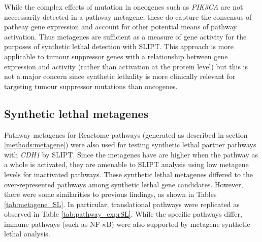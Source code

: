  While the complex effects of mutation in oncogenes such as \textit{PIK3CA} are not neccessarily detected in a pathway metagene, these do capture the consensus of patheay gene expression and account for other potential means of pathway activation. Thus metagenes are sufficient as a measure of gene activity for the purposes of synthetic lethal detection with SLIPT. This approach is more applicable to tumour suppressor genes with a relationship between gene expression and activity (rather than activation at the protein level) but this is not a major concern since synthetic lethality is more clinically relevant for targeting tumour suppressor mutations than oncogenes.

\FloatBarrier

\subsection{Synthetic lethal metagenes} \label{chapt3:metagene_SL}

Pathway metagenes for Reactome pathways (generated as described in section \ref{methods:metagene}) were also used for testing synthetic lethal partner pathways with \textit{CDH1} by SLIPT. Since the metagenes have are higher when the pathway as a whole is activated, they are amenable to SLIPT analysis using low metagene levels for inactivated pathways. These synthetic lethal metagenes differed to the over-represented pathways among synthetic lethal gene candidates. However, there were some similarities to previous findings, as shown in Tables \ref{tab:metagene_SL}. In particular, translational pathways were replicated as observed in Table \ref{tab:pathway_exprSL}. While the specific pathways differ, immune pathways (such as NF-$\kappa$B) were also supported by metagene synthetic lethal analysis.


